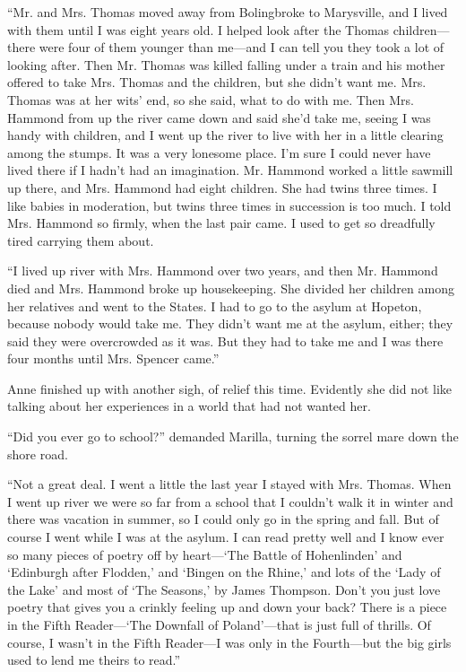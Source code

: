 \documentclass[a4paper]{article}
\begin{document}
``Mr. and Mrs. Thomas moved away from Bolingbroke to Marysville, and I lived with them until I was eight years old. I helped look after the Thomas children---there were four of them younger than me---and I can tell you they took a lot of looking after. Then Mr. Thomas was killed falling under a train and his mother offered to take Mrs. Thomas and the children, but she didn't want me. Mrs. Thomas was at her wits' end, so she said, what to do with me. Then Mrs. Hammond from up the river came down and said she'd take me, seeing I was handy with children, and I went up the river to live with her in a little clearing among the stumps. It was a very lonesome place. I'm sure I could never have lived there if I hadn't had an imagination. Mr. Hammond worked a little sawmill up there, and Mrs. Hammond had eight children. She had twins three times. I like babies in moderation, but twins three times in succession is too much. I told Mrs. Hammond so firmly, when the last pair came. I used to get so dreadfully tired carrying them about.

``I lived up river with Mrs. Hammond over two years, and then Mr. Hammond died and Mrs. Hammond broke up housekeeping. She divided her children among her relatives and went to the States. I had to go to the asylum at Hopeton, because nobody would take me. They didn't want me at the asylum, either; they said they were overcrowded as it was. But they had to take me and I was there four months until Mrs. Spencer came.''

Anne finished up with another sigh, of relief this time. Evidently she did not like talking about her experiences in a world that had not wanted her.

``Did you ever go to school?'' demanded Marilla, turning the sorrel mare down the shore road.

``Not a great deal. I went a little the last year I stayed with Mrs. Thomas. When I went up river we were so far from a school that I couldn't walk it in winter and there was vacation in summer, so I could only go in the spring and fall. But of course I went while I was at the asylum. I can read pretty well and I know ever so many pieces of poetry off by heart---`The Battle of Hohenlinden' and `Edinburgh after Flodden,' and `Bingen on the Rhine,' and lots of the `Lady of the Lake' and most of `The Seasons,' by James Thompson. Don't you just love poetry that gives you a crinkly feeling up and down your back? There is a piece in the Fifth Reader---`The Downfall of Poland'---that is just full of thrills. Of course, I wasn't in the Fifth Reader---I was only in the Fourth---but the big girls used to lend me theirs to read.''
\end{document}

